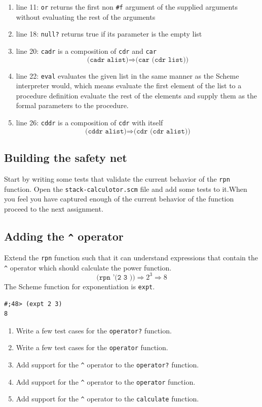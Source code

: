 \documentclass[12pt,a4paper,english,twoside]{article}
\begin{document}
\begin{enumerate}
\item line 11: \texttt{or} returns the first non \texttt{\#f} argument of the 
  supplied arguments without evaluating the rest of the arguments
  \item line 18: \texttt{null?} returns true if its parameter is the empty list
  \item line 20: \texttt{cadr} is a composition of \texttt{cdr} and \texttt{car} 
    \begin{equation*}
      \texttt{(cadr alist)} \Rightarrow \texttt{(car (cdr list))}
    \end{equation*}
  \item line 22: \texttt{eval} evaluates the given list in the same manner as the 
    Scheme interpreter would, which means evaluate the first element of the 
    list to a procedure definition evaluate the rest of the elements and 
    supply them as the formal parameters to the procedure.
  \item line 26: \texttt{cddr} is a composition of \texttt{cdr} with itself
    \begin{equation*}
      \texttt{(cddr alist)} \Rightarrow \texttt{(cdr (cdr alist))}
    \end{equation*}
\end{enumerate}
\subsection{Building the safety net}
Start by writing some tests that validate the current behavior of the 
\texttt{rpn} function. Open the \texttt{stack-calculotor.scm} file and add 
some tests to it.When you feel you have captured enough of the current 
behavior of the function proceed to the next assignment.
\subsection{Adding the \texttt{\^{}} operator}
Extend the \texttt{rpn} function such that it can understand expressions that 
contain the \texttt{\^{}} operator which should calculate the power function.  
\begin{equation*}
\texttt{(rpn '(2 3 \^{}))} \Rightarrow 2^{3} \Rightarrow 8 
\end{equation*}
The Scheme function for exponentiation is \texttt{expt}.
\begin{lstlisting}
#;48> (expt 2 3)
8
\end{lstlisting}
\begin{enumerate}
  \item Write a few test cases for the \texttt{operator?} function.
  \item Write a few test cases for the \texttt{operator} function.
  \item Add support for the \texttt{\^{}} operator to the \texttt{operator?} function.
  \item Add support for the \texttt{\^{}} operator to the \texttt{operator} function. 
  \item Add support for the \texttt{\^{}} operator to the \texttt{calculate} function.
\end{enumerate}
\end{document}
